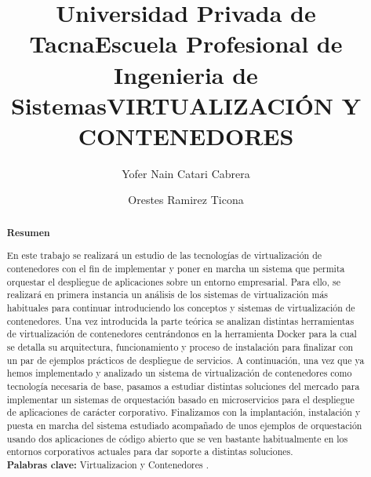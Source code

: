 \documentclass[%
 reprint,
 amsmath,amssymb,
 aps,
]{revtex4-1}
\begin{document}
\title{Universidad Privada de Tacna}
\title{Escuela Profesional de Ingenieria de Sistemas}
\title{VIRTUALIZACIÓN Y CONTENEDORES}
\author{Yofer Nain Catari Cabrera}
\author{Orestes Ramirez Ticona}
%

\begin{abstract}
\begin{center}
\textbf{Resumen}
\end{center}
En este trabajo se realizará un estudio de las tecnologías de virtualización de
contenedores con el fin de implementar y poner en marcha un sistema que permita
orquestar el despliegue de aplicaciones sobre un entorno empresarial.
Para ello, se realizará en primera instancia un análisis de los sistemas de virtualización
más habituales para continuar introduciendo los conceptos y sistemas de virtualización
de contenedores. Una vez introducida la parte teórica se analizan distintas
herramientas de virtualización de contenedores centrándonos en la herramienta
Docker para la cual se detalla su arquitectura, funcionamiento y proceso de instalación
para finalizar con un par de ejemplos prácticos de despliegue de servicios.
A continuación, una vez que ya hemos implementado y analizado un sistema de
virtualización de contenedores como tecnología necesaria de base, pasamos a
estudiar distintas soluciones del mercado para implementar un sistemas de
orquestación basado en microservicios para el despliegue de aplicaciones de carácter
corporativo. Finalizamos con la implantación, instalación y puesta en marcha del
sistema estudiado acompañado de unos ejemplos de orquestación usando dos
aplicaciones de código abierto que se ven bastante habitualmente en los entornos
corporativos actuales para dar soporte a distintas soluciones.
\\
\textbf{Palabras clave:}   Virtualizacion y Contenedores .\\


\end{abstract}
\end{document}
